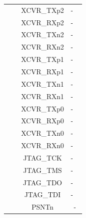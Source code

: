 \documentclass{article}
\begin{document}
\begin{longtable}[l]{|c|c|c|c|}
  & & XCVR\_TXp2 & - \
  \\\cline{3-4}
  & & XCVR\_RXp2 & - \
  \\\cline{3-4}
  & & XCVR\_TXn2 & - \
  \\\cline{3-4}
  & & XCVR\_RXn2 & - \
  \\\cline{3-4}
  & & XCVR\_TXp1 & - \
  \\\cline{3-4}
  & & XCVR\_RXp1 & - \
  \\\cline{3-4}
  & & XCVR\_TXn1 & - \
  \\\cline{3-4}
  & & XCVR\_RXn1 & - \
  \\\cline{3-4}
  & & XCVR\_TXp0 & - \
  \\\cline{3-4}
  & & XCVR\_RXp0 & - \
  \\\cline{3-4}
  & & XCVR\_TXn0 & - \
  \\\cline{3-4}
  & & XCVR\_RXn0 & - \
  \\\cline{3-4}
  & & JTAG\_TCK & - \
  \\\cline{3-4}
  & & JTAG\_TMS & - \
  \\\cline{3-4}
  & & JTAG\_TDO & - \
  \\\cline{3-4}
  & & JTAG\_TDI & - \
  \\\cline{3-4}
  & & PSNTn & - \\
	\hline
\end{longtable}
\end{document}
